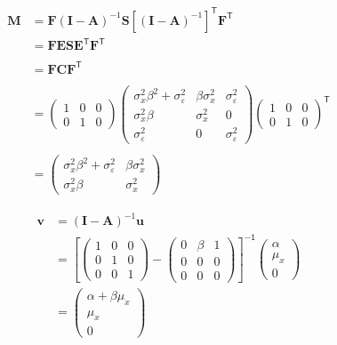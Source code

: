 \documentclass[
]{book}
\theoremstyle{definition}
\theoremstyle{definition}
\theoremstyle{definition}
\theoremstyle{remark}
\begin{document}
\begin{align*}\mathbf{M} &=\mathbf{F} \left( \mathbf{I} - \mathbf{A} \right)^{-1} \mathbf{S} \left[ \left( \mathbf{I} - \mathbf{A} \right)^{-1} \right]^{\mathsf{T}} \mathbf{F}^{\mathsf{T}}\\ &=\mathbf{F} \mathbf{E} \mathbf{S} \mathbf{E}^{\mathsf{T}} \mathbf{F}^{\mathsf{T}} \\\\ &=\mathbf{F} \mathbf{C} \mathbf{F}^{\mathsf{T}} \\\\ &=\left( \begin{array}{ccc} 1 & 0 & 0 \\ 0 & 1 & 0 \end{array} \right)\left( \begin{array}{ccc} \sigma  _{x} ^{2} \beta  ^{2} + \sigma  _{\varepsilon } ^{2} & \beta  \sigma  _{x} ^{2} & \sigma  _{\varepsilon } ^{2} \\ \sigma  _{x} ^{2} \beta  & \sigma  _{x} ^{2} & 0 \\ \sigma  _{\varepsilon } ^{2} & 0 & \sigma  _{\varepsilon } ^{2} \end{array} \right)\left( \begin{array}{ccc} 1 & 0 & 0 \\ 0 & 1 & 0 \end{array} \right)^{\mathsf{T}} \\\\ &=\left( \begin{array}{cc} \sigma  _{x} ^{2} \beta  ^{2} + \sigma  _{\varepsilon } ^{2} & \beta  \sigma  _{x} ^{2} \\ \sigma  _{x} ^{2} \beta  & \sigma  _{x} ^{2} \end{array} \right)\end{align*}

\begin{align*}\mathbf{v} &=\left( \mathbf{I} - \mathbf{A} \right)^{-1} \mathbf{u}\\ &=\left[\left( \begin{array}{ccc} 1 & 0 & 0 \\ 0 & 1 & 0 \\ 0 & 0 & 1 \end{array} \right)-\left( \begin{array}{ccc} 0 & \beta  & 1 \\ 0 & 0 & 0 \\ 0 & 0 & 0 \end{array} \right)\right]^{\mathsf{-1}}\left( \begin{array}{c} \alpha  \\ \mu  _{x} \\ 0 \end{array} \right)\\ &=\left( \begin{array}{c} \alpha  + \beta  \mu  _{x} \\ \mu  _{x} \\ 0 \end{array} \right)\end{align*}
\end{document}
